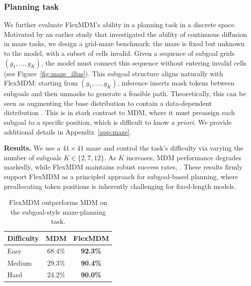 \subsubsection{Planning task}
We further evaluate FlexMDM's ability in a planning task in a discrete space. Motivated by an earlier study \cite{janner2022diffuser} that investigated the ability of continuous diffusion in maze tasks, we design a grid-maze benchmark: the maze is fixed but unknown to the model, with a subset of cells invalid. Given a sequence of subgoal grids $(g_1,\dots,g_{K})$, the model must connect this sequence without entering invalid cells (see Figure~\ref{fig:maze_illus}). This subgoal structure aligns naturally with FlexMDM: starting from $(g_1,\dots,g_K)$, inference inserts mask tokens between subgoals and then unmasks to generate a feasible path. Theoretically, this can be seen as augmenting the base distribution to contain a data-dependent distribution \cite{albergo2024stochastic}. This is in stark contrast to MDM, where it must preassign each subgoal to a specific position, which is difficult to know \emph{a priori}. We provide additional details in Appendix~\ref{app:maze}.

\begin{minipage}{0.62\textwidth}
\textbf{Results.} We use a $41\times41$ maze and control the task's difficulty via varying the number of subgoals $K\in\{2,7,12\}$. As $K$ increases, MDM performance degrades markedly, while FlexMDM maintains robust success rates, . These results firmly support FlexMDM as a principled approach for subgoal-based planning, where preallocating token positions is inherently challenging for fixed-length models.
\end{minipage}
\hfill
\begin{minipage}{0.35\textwidth}
\begin{table}[H]
    \centering
    \vspace{-0.08in}
    \begin{tabular}{lcc}
        \toprule
        \textbf{Difficulty} & \textbf{MDM} & \textbf{FlexMDM} \\
        \midrule
        Easy & 68.4\% & \textbf{92.3\%}  \\
        Medium & 29.3\% & \textbf{90.4\%}\\
        Hard & 24.2\% & \textbf{90.0\%} \\
        \bottomrule
    \end{tabular}
    \vspace{-0.1in}
     \caption{FlexMDM outperforms MDM on the subgoal-style maze-planning task.}
\end{table}
\end{minipage}


